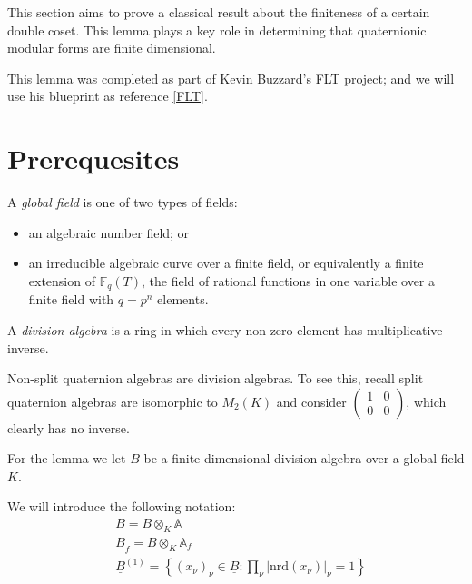 This section aims to prove a classical result about the finiteness of a certain double coset. This
lemma plays a key role in determining that quaternionic modular forms are finite dimensional.

This lemma was completed as part of Kevin Buzzard's FLT project; and we will use his blueprint
as reference \ref{FLT}.

\section{Prerequesites}

\begin{definition}
    A \emph{global field} is one of two types of fields:
    \begin{itemize}
        \item an algebraic number field; or
        \item an irreducible algebraic curve over a finite field, or equivalently a finite extension
        of $\mathbb{F}_q(T)$, the field of rational functions in one variable over a finite field
        with $q = p^n$ elements.
    \end{itemize}
\end{definition}

\begin{definition}
    A \emph{division algebra} is a ring in which every non-zero element has multiplicative inverse.
\end{definition}

\begin{remark}
    Non-split quaternion algebras are division algebras. To see this, recall split quaternion
    algebras are isomorphic to $M_2 (K)$ and consider $\begin{pmatrix} 1 & 0 \\ 0 & 0
    \end{pmatrix}$, which clearly has no inverse.
\end{remark}

For the lemma we let $B$ be a finite-dimensional division algebra over a global field $K$.


We will introduce the following notation:
\begin{align*}
    &\underline{B}  = B \otimes_K \mathds{A} \\
    &\underline{B}_f  = B \otimes_K \mathds{A}_f \\
    &\underline{B}^{(1)} = \left\{ (x_\nu)_\nu \in \underline{B} : \prod_\nu |
      \text{nrd}(x_\nu)|_\nu = 1\right\}
\end{align*}

